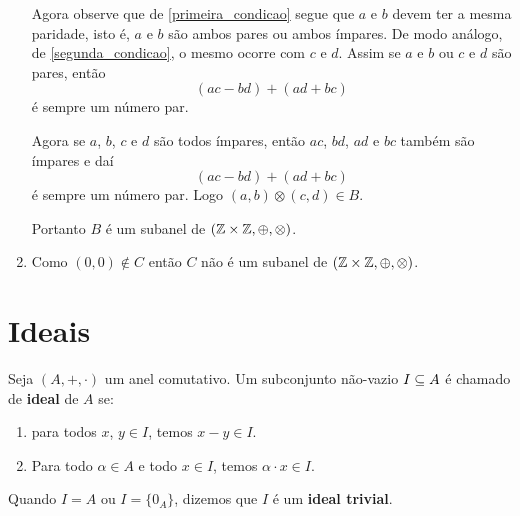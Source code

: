 \begin{exemplo}
\begin{solucao}
\begin{enumerate}[label={\alph*})]
                Agora observe que de \eqref{primeira_condicao} segue que $a$ e $b$ devem ter a mesma paridade, isto é, $a$ e $b$ são
                ambos pares ou ambos ímpares. De modo análogo, de \eqref{segunda_condicao}, o mesmo ocorre com $c$ e $d$. Assim se $a$ e $b$ ou $c$ e $d$ são pares, então
                \[
                    (ac - bd) + (ad + bc)
                \]
                é sempre um número par.

                Agora se $a$, $b$, $c$ e $d$ são todos ímpares, então $ac$, $bd$, $ad$ e $bc$ também são ímpares e daí
                \[
                    (ac - bd) + (ad + bc)
                \]
                é sempre um número par. Logo $(a, b) \otimes (c, d) \in B$.

                Portanto $B$ é um subanel de $(\mathbb{Z} \times \mathbb{Z}, \oplus, \otimes)$.

            \item Como $(0, 0) \notin C$ então $C$ não é um subanel de $(\mathbb{Z} \times \mathbb{Z}, \oplus, \otimes)$.
        \end{enumerate}
    \end{solucao}
\end{exemplo}

\newpage

\section{Ideais} %
\label{sec:ideais}

\begin{definicao}
	Seja $(A, +, \cdot)$ um anel comutativo. Um subconjunto n\~ao-vazio $I \subseteq A$ {\'e} chamado de \textbf{ideal} de $A$ se:
	\begin{enumerate}[label={\roman*})]
		\item para todos $x$, $y \in I$, temos $x - y \in I$.
		\item Para todo $\alpha \in A$ e todo $x \in I$, temos $\alpha\cdot x \in I$.
	\end{enumerate}
\end{definicao}

\begin{observacao}
	Quando $I = A$ ou $I = \{0_A\}$, dizemos que $I$ {\'e} um \textbf{ideal trivial}.
\end{observacao}

